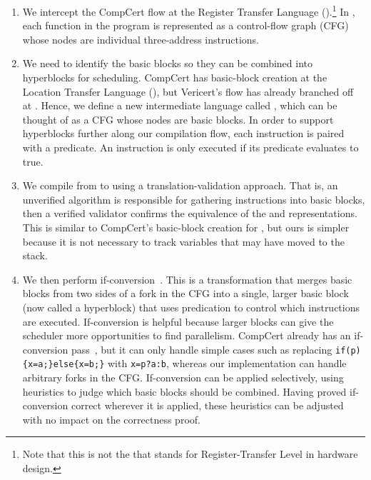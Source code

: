 \begin{enumerate}[label=\protect\blacknum{\arabic*}]
\item We intercept the CompCert flow at the Register Transfer
  Language (\rtl).\footnote{Note that this is not the \rtl{} that stands for
    Register-Transfer Level in hardware design.} In \rtl, each function in the
  program is represented as a control-flow graph (CFG) whose nodes are
  individual three-address instructions.
\item We need to identify the basic blocks so they can be combined into
  hyperblocks for scheduling. CompCert has basic-block
  creation at the Location Transfer Language (\ltl), but Vericert's flow has already branched off at \rtl. Hence, we define a new intermediate language
  called \rtlblock, which can be thought of as a CFG whose nodes are basic
  blocks. In order to support hyperblocks further along our compilation flow,
  each instruction is paired with a predicate. An instruction is only
  executed if its predicate evaluates to true.
\item We compile from \rtl{} to \rtlblock{} using a translation-validation
  approach. That is, an unverified algorithm is responsible for gathering
  instructions into basic blocks, then a verified validator confirms the
  equivalence of the \rtl{} and \rtlblock{} representations.  This is similar to
  CompCert's basic-block creation for \ltl{}, but ours
  is simpler because it is not necessary to track variables that may have moved to the stack.
\item We then perform
  if-conversion~\cite{allen83_conver_contr_depen_data_depen}. This is a
  transformation that merges basic blocks from two sides of a fork in the CFG
  into a single, larger basic block (now called a hyperblock) that uses
  predication to control which instructions are executed. If-conversion is
  helpful because larger blocks can give the scheduler more opportunities to
  find parallelism.
  CompCert already has an if-conversion
  pass~\cite{absint19_compc}, but it can only handle simple cases such as replacing \texttt{if(p)\{x=a;\}else\{x=b;\}} with \texttt{x=p?a:b}, whereas our implementation can handle arbitrary forks in the CFG.
  If-conversion can be applied selectively, using heuristics to judge which
  basic blocks should be combined. Having proved if-conversion correct wherever it is applied, these heuristics can be adjusted with no impact on
  the correctness proof.

\end{enumerate}
